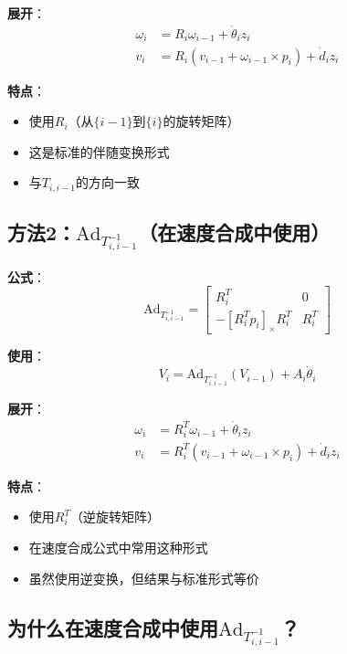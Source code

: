 \documentclass[12pt,a4paper]{article}
\begin{document}
\textbf{展开}：
\begin{align}
\omega_i &= R_i \omega_{i-1} + \dot{\theta}_i z_i \\
v_i &= R_i (v_{i-1} + \omega_{i-1} \times p_i) + \dot{d}_i z_i
\end{align}

\textbf{特点}：
\begin{itemize}
\item 使用$R_i$（从$\{i-1\}$到$\{i\}$的旋转矩阵）
\item 这是标准的伴随变换形式
\item 与$T_{i,i-1}$的方向一致
\end{itemize}

\subsection{方法2：$\text{Ad}_{T_{i,i-1}^{-1}}$（在速度合成中使用）}

\textbf{公式}：
\begin{equation}
\text{Ad}_{T_{i,i-1}^{-1}} = \begin{bmatrix}
R_i^T & 0 \\
-[R_i^T p_i]_{\times} R_i^T & R_i^T
\end{bmatrix}
\end{equation}

\textbf{使用}：
\begin{equation}
V_i = \text{Ad}_{T_{i,i-1}^{-1}}(V_{i-1}) + A_i \dot{\theta}_i
\end{equation}

\textbf{展开}：
\begin{align}
\omega_i &= R_i^T \omega_{i-1} + \dot{\theta}_i z_i \\
v_i &= R_i^T (v_{i-1} + \omega_{i-1} \times p_i) + \dot{d}_i z_i
\end{align}

\textbf{特点}：
\begin{itemize}
\item 使用$R_i^T$（逆旋转矩阵）
\item 在速度合成公式中常用这种形式
\item 虽然使用逆变换，但结果与标准形式等价
\end{itemize}

\subsection{为什么在速度合成中使用$\text{Ad}_{T_{i,i-1}^{-1}}$？}
\end{document}
